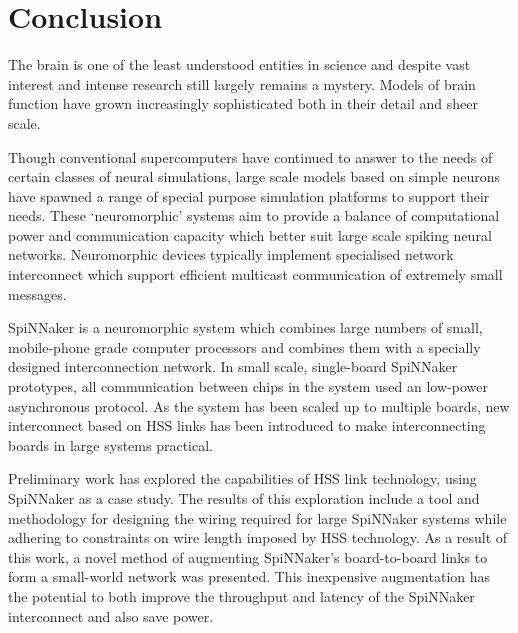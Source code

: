 \chapter{Conclusion}
	
	
	The brain is one of the least understood entities in science and despite vast
	interest and intense research still largely remains a mystery. Models of brain
	function have grown increasingly sophisticated both in their detail and sheer
	scale.
	
	Though conventional supercomputers have continued to answer to the needs of
	certain classes of neural simulations, large scale models based on simple
	neurons have spawned a range of special purpose simulation platforms to
	support their needs. These `neuromorphic' systems aim to provide a balance of
	computational power and communication capacity which better suit large scale
	spiking neural networks. Neuromorphic devices typically implement specialised
	network interconnect which support efficient multicast communication of
	extremely small messages.
	
	SpiNNaker is a neuromorphic system which combines large numbers of small,
	mobile-phone grade computer processors and combines them with a specially
	designed interconnection network. In small scale, single-board SpiNNaker
	prototypes, all communication between chips in the system used an low-power
	asynchronous protocol. As the system has been scaled up to multiple boards,
	new interconnect based on HSS links has been introduced to make
	interconnecting boards in large systems practical.
	
	Preliminary work has explored the capabilities of HSS link technology, using
	SpiNNaker as a case study. The results of this exploration include a tool and
	methodology for designing the wiring required for large SpiNNaker systems
	while adhering to constraints on wire length imposed by HSS technology. As a
	result of this work, a novel method of augmenting SpiNNaker's board-to-board
	links to form a small-world network was presented. This inexpensive
	augmentation has the potential to both improve the throughput and latency of
	the SpiNNaker interconnect and also save power.
	
